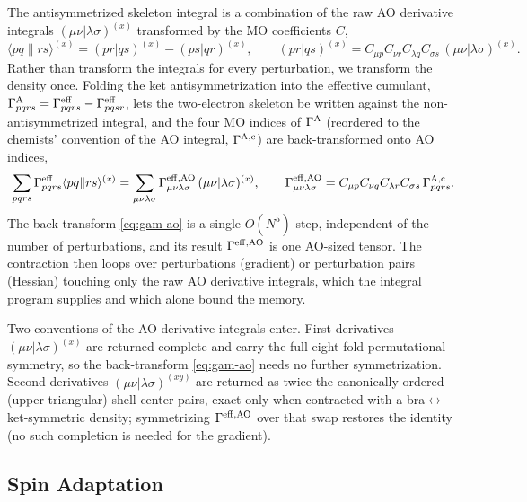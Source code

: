 \documentclass[12pt]{article}
\newcommand{\adb}[2]{\langle #1 \| #2 \rangle}
\begin{document}
The antisymmetrized skeleton integral is a combination of the raw AO derivative
integrals $(\mu\nu|\lambda\sigma)^{(x)}$ transformed by the MO coefficients $C$,
\begin{equation}
\adb{pq}{rs}^{(x)} = (pr|qs)^{(x)} - (ps|qr)^{(x)},
\qquad
(pr|qs)^{(x)} = C_{\mu p} C_{\nu r} C_{\lambda q} C_{\sigma s}\,
(\mu\nu|\lambda\sigma)^{(x)}.
\label{eq:ao-to-mo}
\end{equation}
Rather than transform the integrals for every perturbation, we transform the density
once.  Folding the ket antisymmetrization into the effective cumulant,
$\Gamma^{\rm A}_{pqrs}=\Gamma^{\rm eff}_{pqrs}-\Gamma^{\rm eff}_{pqsr}$, lets the
two-electron skeleton be written against the non-antisymmetrized integral, and the
four MO indices of $\Gamma^{\rm A}$ (reordered to the chemists' convention of the AO
integral, $\Gamma^{\rm A,c}$) are back-transformed onto AO indices,
\begin{equation}
\sum_{pqrs}\Gamma^{\rm eff}_{pqrs}\adb{pq}{rs}^{(x)}
= \sum_{\mu\nu\lambda\sigma}\Gamma^{\rm eff,AO}_{\mu\nu\lambda\sigma}\,
(\mu\nu|\lambda\sigma)^{(x)},
\qquad
\Gamma^{\rm eff,AO}_{\mu\nu\lambda\sigma}
= C_{\mu p} C_{\nu q} C_{\lambda r} C_{\sigma s}\,\Gamma^{\rm A,c}_{pqrs}.
\label{eq:gam-ao}
\end{equation}
The back-transform \eqref{eq:gam-ao} is a single $O(N^5)$ step, independent of the
number of perturbations, and its result $\Gamma^{\rm eff,AO}$ is one AO-sized tensor.
The contraction then loops over perturbations (gradient) or perturbation pairs
(Hessian) touching only the raw AO derivative integrals, which the integral program
supplies and which alone bound the memory.

Two conventions of the AO derivative integrals enter.  First derivatives
$(\mu\nu|\lambda\sigma)^{(x)}$ are returned complete and carry the full eight-fold
permutational symmetry, so the back-transform \eqref{eq:gam-ao} needs no further
symmetrization.  Second derivatives $(\mu\nu|\lambda\sigma)^{(xy)}$ are returned as
twice the canonically-ordered (upper-triangular) shell-center pairs, exact only when
contracted with a bra$\leftrightarrow$ket-symmetric density; symmetrizing
$\Gamma^{\rm eff,AO}$ over that swap restores the identity (no such completion is
needed for the gradient).

\subsection{Spin Adaptation}
\end{document}
